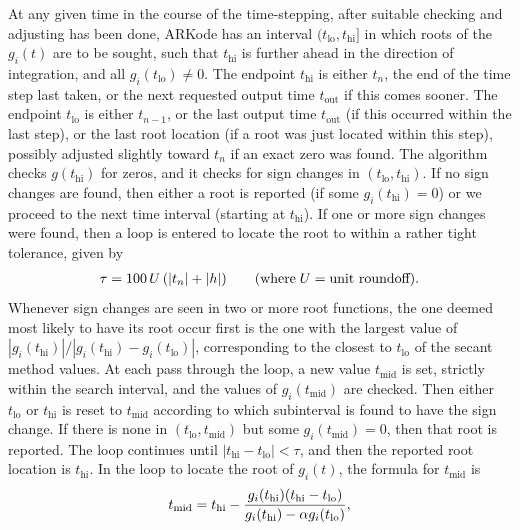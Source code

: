 \documentclass[letterpaper,10pt,english]{sphinxmanual}
\begin{document}
At any given time in the course of the time-stepping, after suitable
checking and adjusting has been done, ARKode has an interval
\((t_\text{lo}, t_\text{hi}]\) in which roots of the \(g_i(t)\) are to
be sought, such that \(t_\text{hi}\) is further ahead in the direction
of integration, and all \(g_i(t_\text{lo}) \ne 0\). The endpoint
\(t_\text{hi}\) is either \(t_n\), the end of the time step last
taken, or the next requested output time \(t_\text{out}\) if this comes
sooner. The endpoint \(t_\text{lo}\) is either \(t_{n-1}\), or the
last output time \(t_\text{out}\) (if this occurred within the last
step), or the last root location (if a root was just located within
this step), possibly adjusted slightly toward \(t_n\) if an exact
zero was found. The algorithm checks \(g(t_\text{hi})\) for zeros, and
it checks for sign changes in \((t_\text{lo}, t_\text{hi})\). If no sign
changes are found, then either a root is reported (if some
\(g_i(t_\text{hi}) = 0\)) or we proceed to the next time interval
(starting at \(t_\text{hi}\)). If one or more sign changes were found,
then a loop is entered to locate the root to within a rather tight
tolerance, given by
\begin{gather}
\begin{split}\tau = 100\, U\, (|t_n| + |h|)\qquad (\text{where}\; U = \text{unit roundoff}).\end{split}\notag
\end{gather}
Whenever sign changes are seen in two or more root functions, the one
deemed most likely to have its root occur first is the one with the
largest value of
\(\left|g_i(t_\text{hi})\right| / \left| g_i(t_\text{hi}) - g_i(t_\text{lo})\right|\),
corresponding to the closest to \(t_\text{lo}\) of the secant method
values. At each pass through the loop, a new value \(t_\text{mid}\) is
set, strictly within the search interval, and the values of
\(g_i(t_\text{mid})\) are checked. Then either \(t_\text{lo}\) or
\(t_\text{hi}\) is reset to \(t_\text{mid}\) according to which
subinterval is found to have the sign change. If there is none in
\((t_\text{lo}, t_\text{mid})\) but some \(g_i(t_\text{mid}) = 0\), then that
root is reported. The loop continues until \(\left|t_\text{hi} -
t_\text{lo} \right| < \tau\), and then the reported root location is
\(t_\text{hi}\).  In the loop to locate the root of \(g_i(t)\), the
formula for \(t_\text{mid}\) is
\begin{gather}
\begin{split}t_\text{mid} = t_\text{hi} -
\frac{g_i(t_\text{hi}) (t_\text{hi} - t_\text{lo})}{g_i(t_\text{hi}) - \alpha g_i(t_\text{lo})} ,\end{split}\notag
\end{gather}
\end{document}
